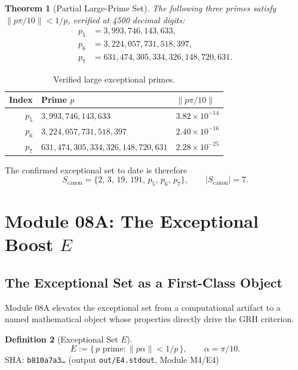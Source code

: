 \documentclass[11pt,letterpaper]{article}
\newtheorem{theorem}{Theorem}[section]
\theoremstyle{definition}
\newtheorem{definition}[theorem]{Definition}
\begin{document}
\begin{theorem}[Partial Large-Prime Set]
The following three primes satisfy $\|p\pi/10\| < 1/p$, verified at 4500 decimal digits:
\begin{align*}
  p_5 &= 3{,}993{,}746{,}143{,}633, \\
  p_6 &= 3{,}224{,}057{,}731{,}518{,}397, \\
  p_7 &= 631{,}474{,}305{,}334{,}326{,}148{,}720{,}631.
\end{align*}
\end{theorem}

\begin{table}[ht]
\centering
\caption{Verified large exceptional primes.}
\begin{tabular}{rll@{}}
\hline
Index & Prime $p$ & $\|p\pi/10\|$ \\
\hline
$p_5$ & $3{,}993{,}746{,}143{,}633$               & $3.82 \times 10^{-14}$ \\
$p_6$ & $3{,}224{,}057{,}731{,}518{,}397$         & $2.40 \times 10^{-16}$ \\
$p_7$ & $631{,}474{,}305{,}334{,}326{,}148{,}720{,}631$ & $2.28 \times 10^{-25}$ \\
\hline
\end{tabular}
\end{table}

The confirmed exceptional set to date is therefore
\[
  S_\mathrm{canon} = \{2,\,3,\,19,\,191,\,p_5,\,p_6,\,p_7\},
  \qquad |S_\mathrm{canon}| = 7.
\]

\section{Module 08A: The Exceptional Boost $E$}\label{sec:m08a}

\subsection*{The Exceptional Set as a First-Class Object}

Module 08A elevates the exceptional set from a computational artifact to a named
mathematical object whose properties directly drive the GRH criterion.

\begin{definition}[Exceptional Set $E$]\label{def:eset}
\[
  E := \{\,p \text{ prime} : \|p\alpha\| < 1/p\,\}, \qquad \alpha = \pi/10.
\]
SHA: \texttt{b810a7a3\ldots} (output \texttt{out/E4.stdout}, Module M4/E4)
\end{definition}
\end{document}
